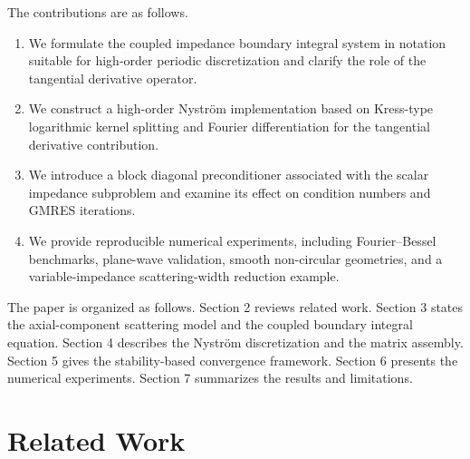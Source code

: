 \documentclass[11pt]{article}
\numberwithin{equation}{section}
\begin{document}
The contributions are as follows.
\begin{enumerate}
\item We formulate the coupled impedance boundary integral system in notation suitable for high-order periodic discretization and clarify the role of the tangential derivative operator.
\item We construct a high-order Nystr\"om implementation based on Kress-type logarithmic kernel splitting and Fourier differentiation for the tangential derivative contribution.
\item We introduce a block diagonal preconditioner associated with the scalar impedance subproblem and examine its effect on condition numbers and GMRES iterations.
\item We provide reproducible numerical experiments, including Fourier--Bessel benchmarks, plane-wave validation, smooth non-circular geometries, and a variable-impedance scattering-width reduction example.
\end{enumerate}

The paper is organized as follows. Section 2 reviews related work. Section 3 states the axial-component scattering model and the coupled boundary integral equation. Section 4 describes the Nystr\"om discretization and the matrix assembly. Section 5 gives the stability-based convergence framework. Section 6 presents the numerical experiments. Section 7 summarizes the results and limitations.

\section{Related Work}
\end{document}
